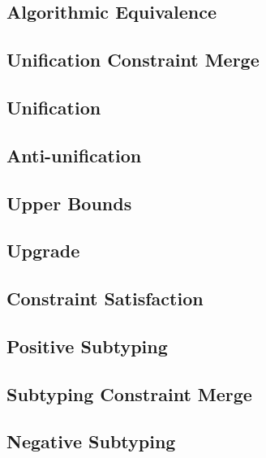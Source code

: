 \documentclass[acmsmall,natbib=false,review,anonymous]{acmart}
\newcommand{\genDir}{_gen}
\begin{document}
\subsection{Algorithmic Equivalence}


\subsection{Unification Constraint Merge}


\subsection{Unification}


\subsection{Anti-unification}


\subsection{Upper Bounds}
\label{sec:alg-upper-bounds-statements}


\subsection{Upgrade}
\label{sec:upgrade-statements}


\subsection{Constraint Satisfaction}


\subsection{Positive Subtyping}


\subsection{Subtyping Constraint Merge}


\subsection{Negative Subtyping}

\end{document}
